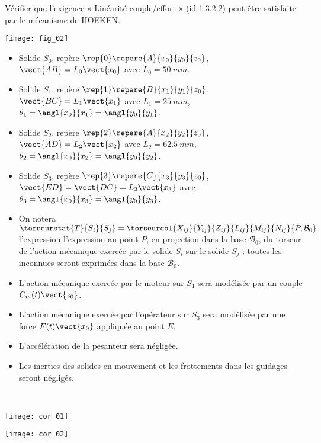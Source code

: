 \begin{obj}
Vérifier que l’exigence « Linéarité couple/effort » (id 1.3.2.2) peut être satisfaite
par le mécanisme de HOEKEN.
\end{obj}


\begin{marginfigure}
\texttt{[image: fig\_02]}
\end{marginfigure}

\begin{itemize}
\item Solide $S_0$, repère $\rep{0}\repere{A}{x_0}{y_0}{z_0}$, $\vect{AB}=L_0\vect{x_0}$ avec $L_0 = \SI{50}{mm}$.
\item Solide $S_1$, repère $\rep{1}\repere{B}{x_1}{y_1}{z_0}$, $\vect{BC}=L_1\vect{x_1}$ avec $L_1 = \SI{25}{mm}$, $\theta_1=\angl{x_0}{x_1}=\angl{y_0}{y_1}$.
\item Solide $S_2$, repère $\rep{2}\repere{A}{x_2}{y_2}{z_0}$, $\vect{AD}=L_2\vect{x_2}$ avec $L_2 = \SI{62,5}{mm}$, $\theta_2=\angl{x_0}{x_2}=\angl{y_0}{y_2}$.
\item Solide $S_3$, repère $\rep{3}\repere{C}{x_3}{y_3}{z_0}$, $\vect{ED}=\vect{DC}=L_2\vect{x_3}$ avec  $\theta_3=\angl{x_0}{x_3}=\angl{y_0}{y_3}$.
\end{itemize}


\begin{itemize}
\item On notera $\torseurstat{T}{S_i}{S_j}=\torseurcol{X_{ij}}{Y_{ij}}{Z_{ij}}{L_{ij}}{M_{ij}}{N_{ij}}{P,\mathcal{B}_0}$ l'expression l’expression au point $P$, en projection dans la
base $\mathcal{B}_0$, du torseur de l’action mécanique exercée par le solide $S_i$ sur le solide $S_j$ ; toutes
les inconnues seront exprimées dans la base $\mathcal{B}_0$.
\item L’action mécanique exercée par le moteur sur $S_1$ sera modélisée par un couple $C_m(t) \vect{z_0}$.
\item L’action mécanique exercée par l’opérateur sur $S_3$ sera modélisée par une force $F(t) \vect{x_0}$
appliquée au point $E$.
\item L’accélération de la pesanteur sera négligée.%
\item Les inerties des solides en mouvement et les frottements dans les guidages seront négligés.
\end{itemize}
\fi

\ifprof
\begin{corrige}~\\

\begin{center}
\texttt{[image: cor\_01]}
\end{center}

\begin{center}
\texttt{[image: cor\_02]}
\end{center}
\end{corrige}
\else
\fi


